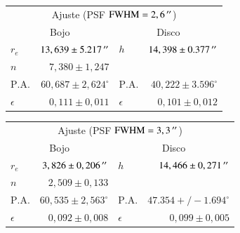 \begin{tabular}{ l  r | l  r }
  \hline
  \multicolumn{4}{c}{Ajuste (PSF $\mathrm{FWHM} = 2,6\,^{\prime\prime}$)} \\
  \multicolumn{2}{c}{Bojo} & \multicolumn{2}{c}{Disco} \\
  \hline
  $r_e$ & $13,639 \pm 5.217\,^{\prime\prime}$ & $h$ & $14,398 \pm 0.377\,^{\prime\prime}$ \\
  $n$ & $7,380 \pm 1,247$ & & \\
  $\mathrm{P.A.}$ & $60,687 \pm 2,624^\circ$ & $\mathrm{P.A.}$ & $40,222
  \pm 3.596^\circ$ \\
  $\epsilon$ & $0,111 \pm 0,011$ & $\epsilon$ & $0,101 \pm 0,012$ \\
  \hline
\end{tabular}

\begin{tabular}{ l  r | l  r }
  \hline
  \multicolumn{4}{c}{Ajuste (PSF $\mathrm{FWHM} = 3,3\,^{\prime\prime}$)} \\
  \multicolumn{2}{c}{Bojo} & \multicolumn{2}{c}{Disco} \\
  \hline
  $r_e$ & $3,826 \pm 0,206\,^{\prime\prime}$ & $h$ & $14,466 \pm 0,271\,^{\prime\prime}$ \\
  $n$ & $2,509 \pm 0,133$ & & \\
  $\mathrm{P.A.}$ & $60,535 \pm 2,563^\circ$ & $\mathrm{P.A.}$ & $47.354 +/-
  1.694^\circ$ \\
  $\epsilon$ & $0,092 \pm 0,008$ & $\epsilon$ & $0,099 \pm 0,005$ \\
  \hline
\end{tabular}


